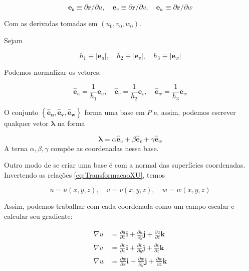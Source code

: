 \begin{equation}\label{eq:VetoresCoordenadosU}
\boxed{\mathbf{e}_{\mathfrak{u}} \equiv \partial \mathbf{r} / \partial u, \quad \mathbf{e}_{v} \equiv \partial \mathbf{r} / \partial v, \quad \mathbf{e}_{w} \equiv \partial \mathbf{r} / \partial w}
\end{equation}


Com as derivadas tomadas em $ (u_0,v_0,w_0) $.

Sejam 

\[
h_{1} \equiv\left|\mathbf{e}_{u}\right|, \quad h_{2} \equiv\left|\mathbf{e}_{v}\right|, \quad h_{3} \equiv\left|\mathbf{e}_{w}\right|
\]

Podemos normalizar os vetores:

\[
\hat{\mathbf{e}}_{u}=\frac{1}{h_{1}} \mathbf{e}_{u}, \quad \mathbf{\hat { e }}_{v}=\frac{1}{h_{2}} \mathbf{e}_{v}, \quad \mathbf{\hat { e }}_{w}=\frac{1}{h_{3}} \mathbf{e}_{w}
\]

O conjunto $ \left\{\hat{\mathbf{e}}_{\boldsymbol{u}}, \mathbf{\hat { e }}_{\boldsymbol{v}}, \hat{\mathbf{e}}_{\boldsymbol{w}}\right\} $ forma uma base em $ P $ e, assim, podemos escrever qualquer vetor $ \mathbf{\lambda} $ na forma

\[
\boldsymbol{\lambda}=\alpha \hat{\mathbf{e}}_{u}+\beta \hat{\mathbf{e}}_{v}+\gamma \hat{\mathbf{e}}_{w}
\]
A terna $ \alpha,\beta,\gamma $ compõe as coordenadas nessa base.

Outro modo de se criar uma base é com a normal das superfícies coordenadas. Invertendo as relações 
\eqref{eq:TransformacaoXU}, temos

\begin{equation}\label{eq:TransformacaoUX}
u=u(x, y, z), \quad v=v(x, y, z), \quad w=w(x, y, z)
\end{equation}

Assim, podemos trabalhar com cada coordenada como um campo escalar e calcular seu gradiente:

\begin{equation}\label{eq:GradienteTransformacaoUX}
\begin{aligned} \nabla u &=\frac{\partial u}{\partial x} \mathbf{i}+\frac{\partial u}{\partial y} \mathbf{j}+\frac{\partial u}{\partial z} \mathbf{k} \\ \nabla v &=\frac{\partial v}{\partial x} \mathbf{i}+\frac{\partial v}{\partial y} \mathbf{j}+\frac{\partial v}{\partial z} \mathbf{k} \\ \nabla w &=\frac{\partial w}{\partial x} \mathbf{i}+\frac{\partial w}{\partial y} \mathbf{j}+\frac{\partial w}{\partial z} \mathbf{k} \end{aligned}
\end{equation}

